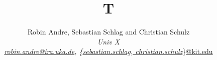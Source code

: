 \documentclass{llncs}
\begin{document}
\title{T}
\author{Robin Andre, Sebastian Schlag and Christian Schulz \\
\textit{Univ X} \\
\small \textit{\url{robin.andre@ira.uka.de}, \{\url{sebastian.schlag, christian.schulz}}\}\url{@kit.edu}}
\institute{}
\maketitle
\end{document}
